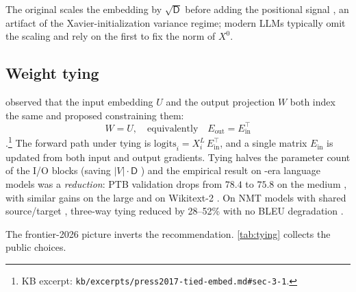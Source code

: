 The original   scales the embedding by
$\sqrt{\mathsf{D}}$ before adding the positional signal
\citep[\S 3.4]{vaswani2017}, an artifact of the Xavier-initialization
variance regime; modern  LLMs typically omit the scaling
and rely on the first  to fix the norm of $X^0$.

\subsection{Weight tying}
\label{sec:tok-tying}

\citet{press2017-tied-embed} observed that the input embedding $U$ and
the output projection $W$ both index the same  and proposed
constraining them:
\begin{equation}
W = U, \quad \text{equivalently} \quad E_{\text{out}} = E_{\text{in}}^\top
\label{eq:tying}
\end{equation}
\citep[\S 3.1]{press2017-tied-embed}.\footnote{KB excerpt:
\texttt{kb/excerpts/press2017-tied-embed.md\#sec-3-1}.} The forward path
under tying is $\mathrm{logits}_i = X^L_i \, E_{\text{in}}^\top$, and a
single matrix $E_{\text{in}}$ is updated from both input and output
gradients. Tying halves the parameter count of the I/O blocks (saving
$|V| \cdot \mathsf{D}$ ) and the empirical result on -era
language models was a  \emph{reduction}: PTB validation drops
from $78.4$ to $75.8$ on the medium , with similar gains on the
large  and on Wikitext-2 \citep[\S 4]{press2017-tied-embed}. On NMT
 models with shared source/target , three-way
tying reduced  by 28--52\% with no BLEU degradation
\citep[\S 5]{press2017-tied-embed}.

The frontier-2026 picture inverts the recommendation. \cref{tab:tying}
collects the public choices.

